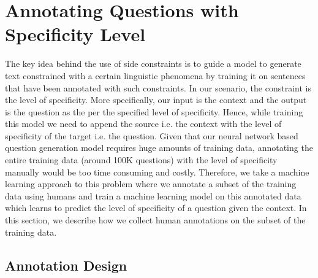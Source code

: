 \documentclass[11pt,a4paper]{article}
\begin{document}
\section{Annotating Questions with Specificity Level}

The key idea behind the use of side constraints is to guide a model to generate text constrained with a certain linguistic phenomena by training it on sentences that have been annotated with such constraints. In our scenario, the constraint is the level of specificity. More specifically, our input is the context and the output is the question as the per the specified level of specificity. Hence, while training this model we need to append the source i.e. the context with the level of specificity of the target i.e. the question. Given that our neural network based question generation model requires huge amounts of training data, annotating the entire training data  (around 100K questions) with the level of specificity manually would be too time consuming and costly. Therefore, we take a machine learning approach to this problem where we annotate a subset of the training data using humans and train a machine learning model on this annotated data which learns to predict the level of specificity of a question given the context. In this section, we describe how we collect human annotations on the subset of the training data. 

\subsection{Annotation Design}
\end{document}
